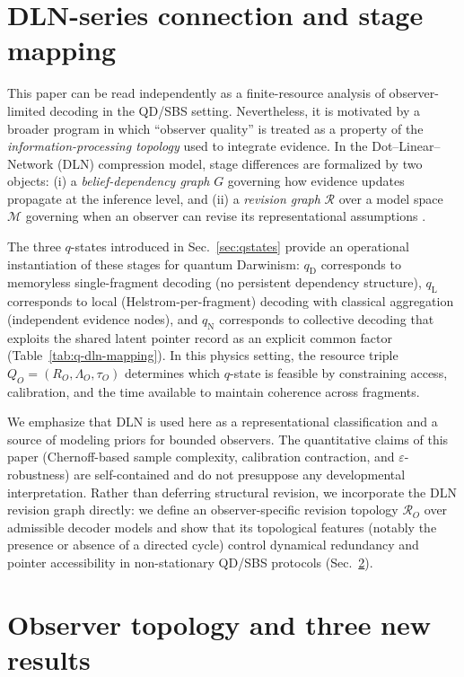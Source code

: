 \documentclass[11pt]{article}
\newcommand{\cR}{\mathcal{R}}
\newcommand{\1}{\mathbf{1}}
\theoremstyle{definition}
\theoremstyle{plain}
\begin{document}
\section{DLN-series connection and stage mapping}
\label{sec:dln-brief}

This paper can be read independently as a finite-resource analysis of observer-limited decoding in the QD/SBS setting.
Nevertheless, it is motivated by a broader program in which ``observer quality'' is treated as a property of the \emph{information-processing topology} used to integrate evidence.
In the Dot--Linear--Network (DLN) compression model, stage differences are formalized by two objects: (i) a \emph{belief-dependency graph} $G$ governing how evidence updates propagate at the inference level, and (ii) a \emph{revision graph} $\mathcal{R}$ over a model space $\mathcal{M}$ governing when an observer can revise its representational assumptions \citep{WuDLNCompression2026preprint}.

The three $q$-states introduced in Sec.~\ref{sec:qstates} provide an operational instantiation of these stages for quantum Darwinism:
$q_{\mathrm{D}}$ corresponds to memoryless single-fragment decoding (no persistent dependency structure),
$q_{\mathrm{L}}$ corresponds to local (Helstrom-per-fragment) decoding with classical aggregation (independent evidence nodes),
and $q_{\mathrm{N}}$ corresponds to collective decoding that exploits the shared latent pointer record as an explicit common factor (Table~\ref{tab:q-dln-mapping}).
In this physics setting, the resource triple $Q_O=(R_O,\Lambda_O,\tau_O)$ determines which $q$-state is feasible by constraining access, calibration, and the time available to maintain coherence across fragments.

We emphasize that DLN is used here as a representational classification and a source of modeling priors for bounded observers.
The quantitative claims of this paper (Chernoff-based sample complexity, calibration contraction, and $\varepsilon$-robustness) are self-contained and do not presuppose any developmental interpretation.
Rather than deferring structural revision, we incorporate the DLN revision graph directly: we define an observer-specific revision topology $\cR_O$ over admissible decoder models and show that its topological features (notably the presence or absence of a directed cycle) control dynamical redundancy and pointer accessibility in non-stationary QD/SBS protocols (Sec.~\ref{sec:observer-topology}).


\section{Observer topology and three new results}
\label{sec:observer-topology}
\end{document}
